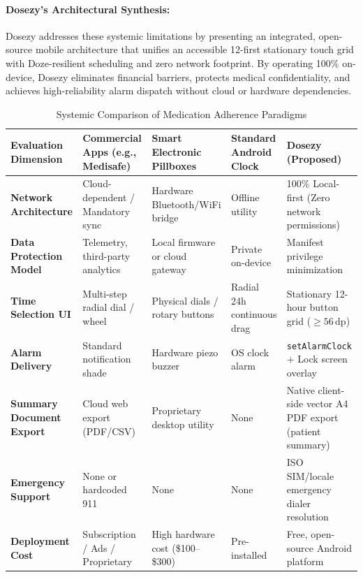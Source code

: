 \documentclass[11pt,a4paper]{article}
\begin{document}
\paragraph{Dosezy's Architectural Synthesis:} Dosezy addresses these systemic limitations by presenting an integrated, open-source mobile architecture that unifies an accessible 12-first stationary touch grid with Doze-resilient scheduling and zero network footprint. By operating 100\% on-device, Dosezy eliminates financial barriers, protects medical confidentiality, and achieves high-reliability alarm dispatch without cloud or hardware dependencies.

\begin{table}[t]
\centering
\small
\caption{Systemic Comparison of Medication Adherence Paradigms}
\label{tab:comparison_matrix}
\begin{tabularx}{\textwidth}{lXXXX}
\toprule
\textbf{Evaluation Dimension} & \textbf{Commercial Apps (e.g., Medisafe)} & \textbf{Smart Electronic Pillboxes} & \textbf{Standard Android Clock} & \textbf{Dosezy (Proposed)} \\
\midrule
\textbf{Network Architecture} & Cloud-dependent / Mandatory sync & Hardware Bluetooth/WiFi bridge & Offline utility & 100\% Local-first (Zero network permissions) \\
\textbf{Data Protection Model} & Telemetry, third-party analytics & Local firmware or cloud gateway & Private on-device & Manifest privilege minimization \\
\textbf{Time Selection UI} & Multi-step radial dial / wheel & Physical dials / rotary buttons & Radial 24h continuous drag & Stationary 12-hour button grid ($\ge 56\,\text{dp}$) \\
\textbf{Alarm Delivery} & Standard notification shade & Hardware piezo buzzer & OS clock alarm & \texttt{setAlarmClock} + Lock screen overlay \\
\textbf{Summary Document Export} & Cloud web export (PDF/CSV) & Proprietary desktop utility & None & Native client-side vector A4 PDF export (patient summary) \\
\textbf{Emergency Support} & None or hardcoded 911 & None & None & ISO SIM/locale emergency dialer resolution \\
\textbf{Deployment Cost} & Subscription / Ads / Proprietary & High hardware cost (\$100--\$300) & Pre-installed & Free, open-source Android platform \\
\bottomrule
\end{tabularx}
\end{table}
\end{document}
